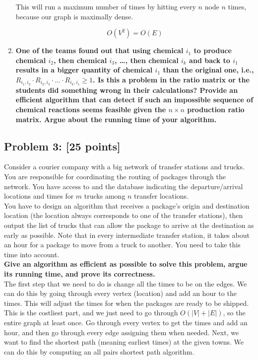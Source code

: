 \documentclass[11pt]{article}
\begin{document}
\begin{enumerate}[label=\textbf{\Alph*.}]
This will run a maximum number of times by hitting every $n$ node $n$ times,
because our graph is maximally dense.

$$O(V^2) = O(E)$$

\item  \textbf{One of the teams found out that using chemical
$i_1$ to produce chemical $i_2$, then chemical $i_3$, \dots, then
chemical $i_k$ and back to $i_1$ results in a bigger quantity of
chemical $i_1$ than the original one, i.e., $R_{i_1,i_2} \cdot
R_{i_2,i_3} \cdot \ldots \cdot R_{i_k,i_1} \geq 1$. Is this a problem
in the ratio matrix or the students did something wrong in their
calculations? Provide an efficient algorithm that can detect if such
an impossible sequence of chemical reactions seems feasible given the
$n \times n$ production ratio matrix. Argue about the running time of
your algorithm.}
\end{enumerate}

\subsection*{Problem 3: [25 points]} Consider a courier company with
a big network of transfer stations and trucks. You are responsible for
coordinating the routing of packages through the network. You have
access to and the database indicating the departure/arrival locations
and times for $m$ trucks among $n$ transfer locations.\\

\noindent You have to design an algorithm that receives a package's
origin and destination location (the location always corresponds to
one of the transfer stations), then output the list of trucks that can
allow the package to arrive at the destination as early as
possible. Note that in every intermediate transfer station, it takes
about an hour for a package to move from a truck to another. You need
to take this time into account.\\

\noindent \textbf{Give an algorithm as efficient as possible to solve this
problem, argue its running time, and prove its correctness.}\\

The first step that we need to do is change all the times to be on the edges. We can do this by going through every vertex (location) and add an hour to the times. This will adjust the times for when the packages are ready to be shipped. This is the costliest part, and we just need to go through $O(|V| + |E|)$, so the entire graph at least once. Go through every vertex to get the times and add an hour, and then go through every edge assigning them when needed. Next, we want to find the shortest path (meaning earliest times) at the given towns. We can do this by computing an all pairs shortest path algorithm.
\end{document}
